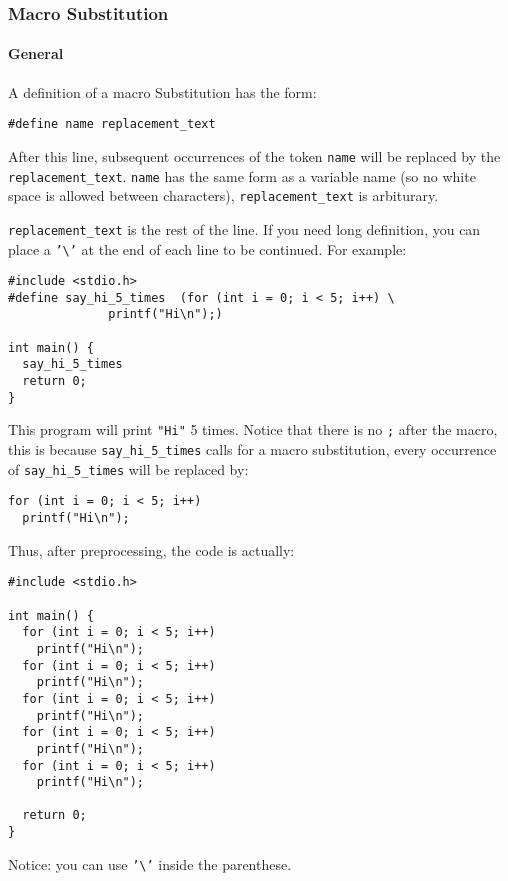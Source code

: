 \documentclass[12pt]{article}
\begin{document}
\subsubsection{Macro Substitution}
\label{sec:org06839d9}
\paragraph{General}
\label{sec:org5b2215c}
A definition of a macro Substitution has the form:
\begin{verbatim}
#define name replacement_text
\end{verbatim}
After this line, subsequent occurrences of the token \texttt{name} will be replaced by the \texttt{replacement\_text}. \texttt{name} has the same form as a variable name (so no white space is allowed between characters), \texttt{replacement\_text} is arbiturary.

\texttt{replacement\_text} is the rest of the line. If you need long definition, you can place a \texttt{'\textbackslash{}'} at the end of each line to be continued. For example:
\begin{verbatim}
#include <stdio.h>
#define say_hi_5_times  (for (int i = 0; i < 5; i++) \
			  printf("Hi\n");)

int main() {
  say_hi_5_times
  return 0;
}
\end{verbatim}
This program will print \texttt{"Hi"} 5 times. Notice that there is no \texttt{;} after the macro, this is because \texttt{say\_hi\_5\_times} calls for a macro substitution, every occurrence of \texttt{say\_hi\_5\_times} will be replaced by:
\begin{verbatim}
for (int i = 0; i < 5; i++)
  printf("Hi\n");
\end{verbatim}
Thus, after preprocessing, the code is actually:
\begin{verbatim}
#include <stdio.h>

int main() {
  for (int i = 0; i < 5; i++)
    printf("Hi\n");
  for (int i = 0; i < 5; i++)
    printf("Hi\n");
  for (int i = 0; i < 5; i++)
    printf("Hi\n");
  for (int i = 0; i < 5; i++)
    printf("Hi\n");
  for (int i = 0; i < 5; i++)
    printf("Hi\n");

  return 0;
}
\end{verbatim}
Notice: you can use \texttt{'\textbackslash{}'} inside the parenthese.
\end{document}

